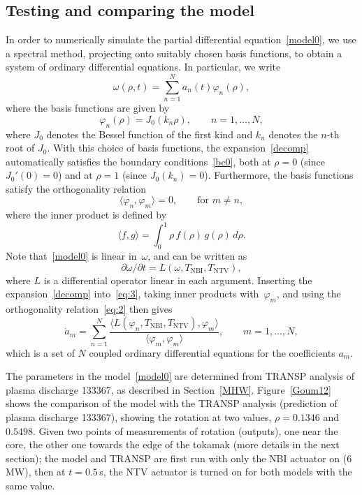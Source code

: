 \documentclass{iopart}
\begin{document}
\subsection{Testing and comparing the model}
In order to numerically simulate the partial differential equation~\eqref{model0}, we use a spectral method, projecting onto suitably chosen basis functions, to obtain a system of ordinary differential equations.  In particular, we write
\begin{equation}
\omega(\rho,t)  = \sum_{n=1}^{N} a_n(t) \varphi_n(\rho),
\label{decomp}
\end{equation}
where the basis functions are given by
\begin{equation}
  \label{eq:1}
  \varphi_n(\rho) = J_0(k_n\rho),\qquad n=1,\ldots,N,
\end{equation}
where $J_0$ denotes the Bessel function of the first kind and $k_n$ denotes the $n$-th root of $J_0$.  With this choice of basis functions, the expansion~\eqref{decomp} automatically satisfies the boundary conditions~\eqref{bc0}, both at $\rho=0$ (since $J_0'(0)=0$) and at $\rho=1$ (since $J_0(k_n)=0$).  Furthermore, the basis functions satisfy the orthogonality relation
\begin{equation}
  \label{eq:2}
  \langle \varphi_n,\varphi_m\rangle = 0,\qquad \text{for $m\ne n$},
\end{equation}
where the inner product is defined by
\begin{equation*}
\langle f,g \rangle =   \int^1 _0 \rho \, f(\rho) \, g(\rho) \, d\rho.
\end{equation*}
Note that~\eqref{model0} is linear in~$\omega$, and can be written as
\begin{equation}
\label{eq:3}
\partial \omega/\partial t=L(\omega,T_\text{NBI},T_\text{NTV}),
\end{equation}
where $L$ is a differential operator linear in each argument.  Inserting the expansion~\eqref{decomp} into~\eqref{eq:3}, taking inner products with~$\varphi_m$, and using the orthogonality relation~\eqref{eq:2} then gives
\begin{equation*}
  \dot a_m = \sum_{n=1}^N \frac{\langle L(\varphi_n, T_\text{NBI}, T_\text{NTV}),
    \varphi_m\rangle}{\langle \varphi_m,\varphi_m\rangle},\qquad m=1,\ldots,N,
\end{equation*}
which is a set of $N$ coupled ordinary differential equations for the coefficients $a_m$.

The parameters in the model~\eqref{model0} are determined from TRANSP analysis of plasma discharge 133367, as described in Section~\ref{MHW}.  Figure~\ref{Goum12} shows the comparison of the model with the TRANSP analysis (prediction of plasma discharge 133367), showing the rotation at two values, $\rho=0.1346$ and $0.5498$.
%
Given two points of measurements of rotation (outputs), one near the core, the other one towards the edge of the tokamak (more details in the next section); the model and TRANSP are first run with only the NBI actuator on ($6$\,MW), then at $t=0.5$\,s, the NTV actuator is turned on for both models with the same value. 
\end{document}

